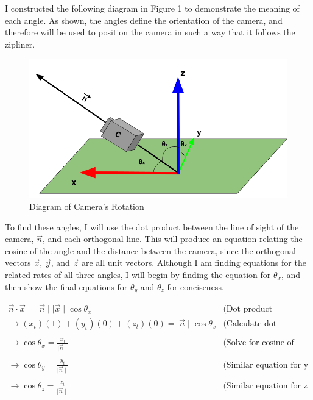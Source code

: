 \documentclass[12pt]{article}
\begin{document}
I constructed the following diagram in Figure 1 to demonstrate the meaning of each angle. As shown, the angles define the orientation of the camera, and therefore will be used to position the camera in such a way that it follows the zipliner.

\begin{figure}[H]
\centering
\includegraphics[width=400pt]{img/angles.png}
\caption{\label{fig:1}Diagram of Camera's Rotation}
\end{figure}

To find these angles, I will use the dot product between the line of sight of the camera, $\vec n$, and each orthogonal line. This will produce an equation relating the cosine of the angle and the distance between the camera, since the orthogonal vectors $\vec x$, $\vec y$, and $\vec z$ are all unit vectors. Although I am finding equations for the related rates of all three angles, I will begin by finding the equation for $\theta_x$, and then show the final equations for $\theta_y$ and $\theta_z$ for conciseness.

$$
\begin{array}{c|c}
 \vec n \cdot \vec x = \mid \vec n \mid \mid \vec x \mid \cos \theta_x & \text{(Dot product equation)} \\
 \rightarrow (x_t)(1) + (y_t)(0) + (z_t)(0) = \mid \vec n \mid \cos \theta_x & \text{(Calculate dot product)} \\ \\
 \boxed{\rightarrow \cos \theta_x =  \frac{x_t}{\mid \vec n \mid}} & \text{(Solve for cosine of angle)}\\ \\
 \boxed{\rightarrow \cos\theta_y =  \frac{y_t}{\mid \vec n \mid}} & \text{(Similar equation for y angle)}\\ \\
 \boxed{\rightarrow \cos \theta_z = \frac{z_t}{\mid \vec n \mid}} & \text{(Similar equation for z angle)} \\
\end{array}
$$
\end{document}
